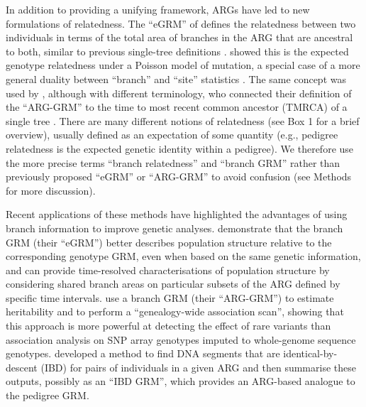 In addition to providing a unifying framework,
ARGs have led to new formulations of relatedness.
%
The ``eGRM'' of \citet{fan2022genealogical}
defines the relatedness between two individuals
in terms of the total area of branches in the ARG that are ancestral to both,
similar to previous single-tree definitions \citep{slatkin1991inbreeding}.
%
\citet{fan2022genealogical} showed this is the expected genotype relatedness
under a Poisson model of mutation,
a special case of a more general duality between ``branch''
and ``site'' statistics \citep{ralph2019empirical, ralph2020efficiently}.
%
The same concept was used by \citet{zhang2023biobank},
although with different terminology,
who connected their definition of the ``ARG-GRM'' to
the time to most recent common ancestor (TMRCA)
of a single tree \citep{slatkin1991inbreeding, mcvean2009genealogical}.
%
There are many different notions of relatedness (see Box 1 for a 
brief overview), usually defined as an expectation of some 
quantity (e.g., pedigree relatedness is the expected genetic identity within a pedigree).
We therefore use the more precise terms 
``branch relatedness'' and ``branch GRM'' 
rather than previously proposed ``eGRM'' or ``ARG-GRM'' 
to avoid confusion (see Methods for more discussion).

Recent applications of these methods have highlighted the advantages of
using branch information to improve genetic analyses.
%
\citet{fan2022genealogical} demonstrate that the branch GRM (their ``eGRM'')
better describes population structure relative to the corresponding genotype GRM,
even when based on the same genetic information,
and can provide time-resolved characterisations of population structure
by considering shared branch areas on particular subsets of the ARG
defined by specific time intervals.
%
\citet{zhang2023biobank} use a branch GRM (their ``ARG-GRM'')
to estimate heritability and to perform a ``genealogy-wide association scan'',
showing that this approach is more powerful at detecting the effect of rare variants
than association analysis on SNP array genotypes imputed to whole-genome sequence genotypes.
%
\citet{tsambos2022efficient} developed a method
to find DNA segments that are identical-by-descent (IBD) for pairs of individuals in a given ARG and
then summarise these outputs, possibly as an ``IBD GRM'',
which provides an ARG-based analogue to the pedigree GRM.


